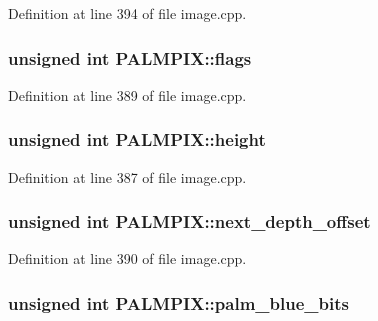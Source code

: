 Definition at line 394 of file image.\+cpp.

\hypertarget{structPALMPIX_a7159c9ddf91b7e3c6300e4100adbd6e5}{
\subsubsection[{flags}]{\setlength{\rightskip}{0pt plus 5cm}unsigned int P\+A\+L\+M\+P\+I\+X\+::flags}}\label{structPALMPIX_a7159c9ddf91b7e3c6300e4100adbd6e5}


Definition at line 389 of file image.\+cpp.

\hypertarget{structPALMPIX_aeb2458e16e733418d1897ea577f539df}{
\subsubsection[{height}]{\setlength{\rightskip}{0pt plus 5cm}unsigned int P\+A\+L\+M\+P\+I\+X\+::height}}\label{structPALMPIX_aeb2458e16e733418d1897ea577f539df}


Definition at line 387 of file image.\+cpp.

\hypertarget{structPALMPIX_a53bf150bd435a6aeadff69c8d025266d}{
\subsubsection[{next\+\_\+depth\+\_\+offset}]{\setlength{\rightskip}{0pt plus 5cm}unsigned int P\+A\+L\+M\+P\+I\+X\+::next\+\_\+depth\+\_\+offset}}\label{structPALMPIX_a53bf150bd435a6aeadff69c8d025266d}


Definition at line 390 of file image.\+cpp.

\hypertarget{structPALMPIX_abd2f75ac5d479323c3c0998940b0f17a}{
\subsubsection[{palm\+\_\+blue\+\_\+bits}]{\setlength{\rightskip}{0pt plus 5cm}unsigned int P\+A\+L\+M\+P\+I\+X\+::palm\+\_\+blue\+\_\+bits}}\label{structPALMPIX_abd2f75ac5d479323c3c0998940b0f17a}


